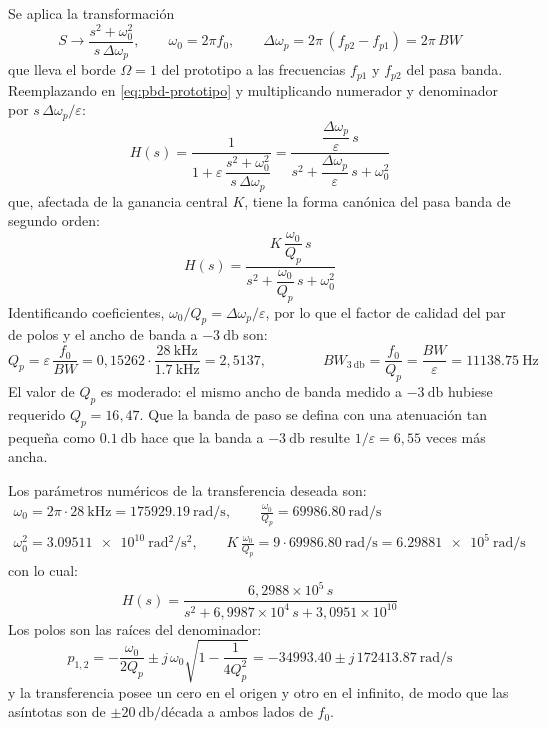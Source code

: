Se aplica la transformación
\begin{equation}
  S \rightarrow \frac{s^2 + \omega_0^2}{s\,\Delta\omega_p}, \qquad
  \omega_0 = 2\pi f_0, \qquad \Delta\omega_p = 2\pi\,(f_{p2} - f_{p1}) = 2\pi\,BW
  \label{eq:pbd-transformacion}
\end{equation}
que lleva el borde $\Omega = 1$ del prototipo a las frecuencias $f_{p1}$ y $f_{p2}$ del pasa banda. Reemplazando en
\eqref{eq:pbd-prototipo} y multiplicando numerador y denominador por $s\,\Delta\omega_p / \varepsilon$:
\begin{equation}
  H(s) = \frac{1}{1 + \varepsilon\,\dfrac{s^2 + \omega_0^2}{s\,\Delta\omega_p}}
  = \frac{\dfrac{\Delta\omega_p}{\varepsilon}\,s}{s^2 + \dfrac{\Delta\omega_p}{\varepsilon}\,s + \omega_0^2}
\end{equation}
que, afectada de la ganancia central $K$, tiene la forma canónica del pasa banda de segundo orden:
\begin{equation}
  H(s) = \frac{K\,\dfrac{\omega_0}{Q_p}\,s}{s^2 + \dfrac{\omega_0}{Q_p}\,s + \omega_0^2}
  \label{eq:pbd-canonica}
\end{equation}
Identificando coeficientes, $\omega_0 / Q_p = \Delta\omega_p / \varepsilon$, por lo que el factor de calidad del par
de polos y el ancho de banda a $\SI{-3}{\decibel}$ son:
\begin{equation}
  Q_p = \varepsilon\,\frac{f_0}{BW} = 0{,}15262 \cdot \frac{\SI{28}{\kilo\hertz}}{\SI{1.7}{\kilo\hertz}}
  = 2{,}5137, \qquad\qquad
  BW_{\SI{3}{\decibel}} = \frac{f_0}{Q_p} = \frac{BW}{\varepsilon} = \SI{11138.75}{\hertz}
  \label{eq:pbd-qp}
\end{equation}
El valor de $Q_p$ es moderado: el mismo ancho de banda medido a $\SI{-3}{\decibel}$ hubiese requerido
$Q_p = 16{,}47$. Que la banda de paso se defina con una atenuación tan pequeña como $\SI{0.1}{\decibel}$ hace que la
banda a $\SI{-3}{\decibel}$ resulte $1/\varepsilon = 6{,}55$ veces más ancha.

Los parámetros numéricos de la transferencia deseada son:
\begin{gather*}
  \omega_0 = 2\pi \cdot \SI{28}{\kilo\hertz} = \SI{175929.19}{\radian/\second}, \qquad
  \frac{\omega_0}{Q_p} = \SI{69986.80}{\radian/\second} \\
  \omega_0^2 = \SI{3.09511e10}{\radian^2/\second^2}, \qquad
  K\,\frac{\omega_0}{Q_p} = 9 \cdot \SI{69986.80}{\radian/\second} = \SI{6.29881e5}{\radian/\second}
\end{gather*}
con lo cual:
\begin{equation}
  H(s) = \frac{6{,}2988 \times 10^5\,s}{s^2 + 6{,}9987 \times 10^4\,s + 3{,}0951 \times 10^{10}}
  \label{eq:pbd-transferencia-num}
\end{equation}
Los polos son las raíces del denominador:
\begin{equation}
  p_{1,2} = -\frac{\omega_0}{2 Q_p} \pm j\,\omega_0 \sqrt{1 - \frac{1}{4 Q_p^2}}
  = -\num{34993.40} \pm j\,\num{172413.87} \ \si{\radian/\second}
\end{equation}
y la transferencia posee un cero en el origen y otro en el infinito, de modo que las asíntotas son de
$\pm\SI{20}{\decibel/\text{década}}$ a ambos lados de $f_0$.

